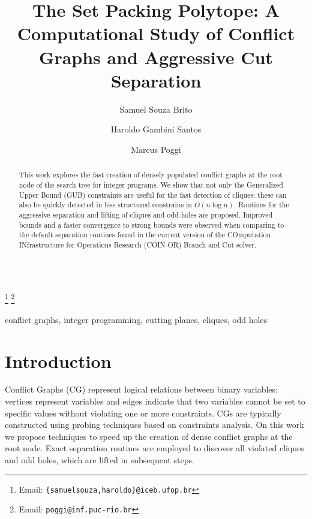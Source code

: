 \documentclass{endm}
\begin{document}
  

\begin{verbatim}\end{verbatim}\vspace{2.5cm}

\begin{frontmatter}

\title{The Set Packing Polytope: A Computational Study of Conflict Graphs and Aggressive Cut Separation}
\author{Samuel Souza Brito \and Haroldo Gambini Santos}
\address{{\small Dep. de Computação, Universidade Federal de Ouro Preto - UFOP}}
\author{Marcus Poggi}
\address{{\small Dep. de Informática, Pontifícia Universidade Católica do Rio de Janeiro}}
\thanks[mailSamuelHaroldo]{Email: {\texttt{\normalshape \{samuelsouza,haroldo\}@iceb.ufop.br}}} 
\thanks[mailPoggi]{Email: {\texttt{\normalshape poggi@inf.puc-rio.br}}}  

\begin{abstract}
This work explores the fast creation of densely populated conflict graphs at the root node of the search tree for integer programs. We show that not only the Generalized Upper Bound (GUB) constraints are useful for the fast detection of cliques: these can also be quickly detected in less structured constrains in $O( n \log n )$. Routines for the aggressive separation and lifting of cliques and odd-holes are proposed. Improved bounds and a faster convergence to strong bounds were observed when comparing to the default separation routines found in the current version of the COmputation INfrastructure for Operations Research (COIN-OR) Branch and Cut solver.
\end{abstract}

\begin{keyword}
conflict graphs, integer programming, cutting planes, cliques, odd holes
\end{keyword}

\end{frontmatter}


\section{Introduction}\label{intro}

Conflict Graphs (CG) represent logical relations between binary variables: vertices represent variables and edges indicate that two variables cannot be set to specific values without violating one or more constraints. CGs are typically constructed using probing techniques\cite{Borndorfer1998} based on constraints analysis. On this work we propose techniques to speed up the creation of dense conflict graphs at the root node. Exact separation routines are employed to discover all violated cliques and odd holes, which are lifted in subsequent steps.
\end{document}

